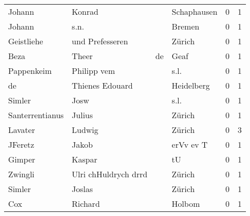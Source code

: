 \begin{tabular}{llllrr}
                   Johann &                             Konrad &             &                                 Schaphausen &          0 &         1 \\
                   Johann &                               s.n. &             &                                      Bremen &          0 &         1 \\
               Geistliehe &                    und Prefesseren &             &                                      Zürich &          0 &         1 \\
                     Beza &                              Theer &          de &                                        Geaf &          0 &         1 \\
               Pappenkeim &                        Philipp vem &             &                                        s.l. &          0 &         1 \\
                       de &                    Thienes Edouard &             &                                  Heidelberg &          0 &         1 \\
                   Simler &                               Josw &             &                                        s.l. &          0 &         1 \\
          Santerrentianus &                             Julius &             &                                      Zürich &          0 &         1 \\
                  Lavater &                             Ludwig &             &                                      Zürich &          0 &         3 \\
                  JFeretz &                              Jakob &             &                                   erVv ev T &          0 &         1 \\
                   Gimper &                             Kaspar &             &                                          tU &          0 &         1 \\
                  Zwingli &               Ulri chHuldrych drrd &             &                                      Zürich &          0 &         1 \\
                   Simler &                             Joslas &             &                                      Zürich &          0 &         1 \\
                      Cox &                            Richard &             &                                      Holbom &          0 &         1 \\

\end{tabular}
